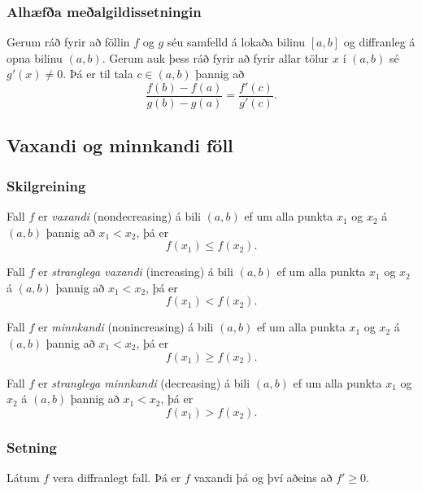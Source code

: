\documentclass[icelandic,a4paper,12pt]{article}
\begin{document}
\subsubsection{Alhæfða meðalgildissetningin}  Gerum ráð fyrir að föllin $f$ og
$g$ séu samfelld á lokaða bilinu $[a,b]$ og diffranleg á opna bilinu $(a,b)$.  Gerum auk
þess ráð fyrir að fyrir allar tölur $x$ í $(a,b)$ sé $g'(x)\neq 0$.  Þá er til
tala $c\in (a,b)$ þannig að $$\frac{f(b)-f(a)}{g(b)-g(a)}=\frac{f'(c)}{g'(c)}.$$

\subsection{Vaxandi og minnkandi föll}
\subsubsection{Skilgreining}
Fall $f$ er \emph{vaxandi} (nondecreasing) á bili $(a,b)$ ef um alla punkta
$x_1$ og $x_2$ á $(a,b)$ þannig að $x_1 < x_2$, þá er\vspace{-0.1in}
\begin{equation*}
	f(x_1) \leq f(x_2).
\end{equation*}

Fall $f$ er \emph{stranglega vaxandi} (increasing) á bili $(a,b)$ ef um alla punkta
$x_1$ og $x_2$ á $(a,b)$ þannig að $x_1 < x_2$, þá er\vspace{-0.1in}
\begin{equation*}
	f(x_1) < f(x_2).
\end{equation*}

Fall $f$ er \emph{minnkandi} (nonincreasing) á bili $(a,b)$ ef um alla punkta
$x_1$ og $x_2$ á $(a,b)$ þannig að $x_1 < x_2$, þá er\vspace{-0.1in}
\begin{equation*}
	f(x_1) \geq f(x_2).
\end{equation*}
	
Fall $f$ er \emph{stranglega minnkandi} (decreasing) á bili $(a,b)$ ef um alla punkta
$x_1$ og $x_2$ á $(a,b)$ þannig að $x_1 < x_2$, þá er\vspace{-0.1in}
\begin{equation*}
	f(x_1) > f(x_2).
\end{equation*}

\subsubsection{Setning}
Látum $f$ vera diffranlegt fall. Þá er $f$ vaxandi þá og því aðeins að $f' \geq 0$.
\end{document}

